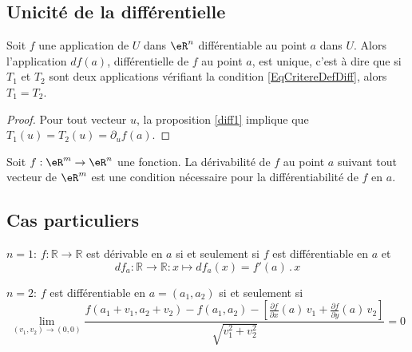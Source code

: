 \subsection{Unicité de la différentielle}

\begin{corollary}
	Soit $f$ une application de $U$ dans $\eR^n$ différentiable au point $a$ dans $U$. Alors l'application $df(a)$, différentielle de $f$ au point $a$, est unique, c'est à dire que si $T_1$ et $T_2$ sont deux applications vérifiant la condition \eqref{EqCritereDefDiff}, alors $T_1=T_2$.
\end{corollary}

\begin{proof}
    Pour tout vecteur $u$, la proposition \ref{diff1} implique que $T_1(u)=T_2(u)=\partial_uf(a)$.
\end{proof}

\begin{corollary}
Soit  $f:\eR^m\to \eR^n$ une fonction.  La dérivabilité de $f$ au point  $a$ suivant tout vecteur de $\eR^m$ est une condition nécessaire pour la différentiabilité de $f$ en $a$.
\end{corollary}

\subsection{Cas particuliers}

\begin{description}
    \item $n=1$:
$f: \mathbb{R}\rightarrow \mathbb{R}$ est dérivable en $a$ si et
seulement si $f$ est différentiable en $a$ et
$$df_a:\mathbb{R}\rightarrow \mathbb{R}: x \mapsto df_a(x) =
f'(a)\,.\,x$$ 
\item
    $n=2$: $f$ est différentiable en $a =(a_1, a_2)$
si et seulement si
$$\lim_{(v_1,v_2)\rightarrow (0,0)} \frac{f(a_1+v_1, a_2+v_2) - f(a_1,a_2) - [ \frac{\partial f}{\partial x}(a)\,v_1+
\frac{\partial f}{\partial y}(a)\,v_2]}{\sqrt{v_1^2+v_2^2}} = 0
$$\end{description}\vspace{0.3cm}


